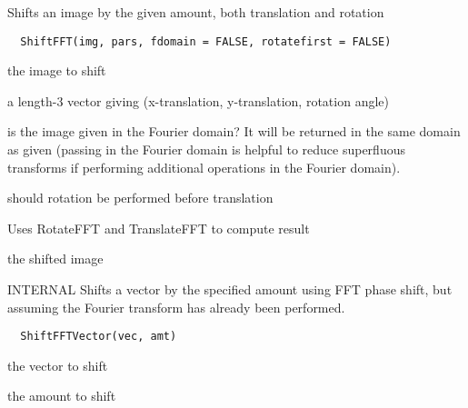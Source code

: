\documentclass[a4paper]{book}
\begin{document}
%
\begin{Description}\relax
Shifts an image by the given amount, both translation and
rotation
\end{Description}
%
\begin{Usage}
\begin{verbatim}
  ShiftFFT(img, pars, fdomain = FALSE, rotatefirst = FALSE)
\end{verbatim}
\end{Usage}
%
\begin{Arguments}
\begin{ldescription}
\item[\code{img}] the image to shift

\item[\code{pars}] a length-3 vector giving (x-translation,
y-translation, rotation angle)

\item[\code{fdomain}] is the image given in the Fourier domain?
It will be returned in the same domain as given (passing
in the Fourier domain is helpful to reduce superfluous
transforms if performing additional operations in the
Fourier domain).

\item[\code{rotatefirst}] should rotation be performed before
translation
\end{ldescription}
\end{Arguments}
%
\begin{Details}\relax
Uses RotateFFT and TranslateFFT to compute result
\end{Details}
%
\begin{Value}
the shifted image
\end{Value}
%
\begin{Description}\relax
INTERNAL Shifts a vector by the specified amount using
FFT phase shift, but assuming the Fourier transform has
already been performed.
\end{Description}
%
\begin{Usage}
\begin{verbatim}
  ShiftFFTVector(vec, amt)
\end{verbatim}
\end{Usage}
%
\begin{Arguments}
\begin{ldescription}
\item[\code{vec}] the vector to shift

\item[\code{amt}] the amount to shift
\end{ldescription}
\end{Arguments}
\end{document}
